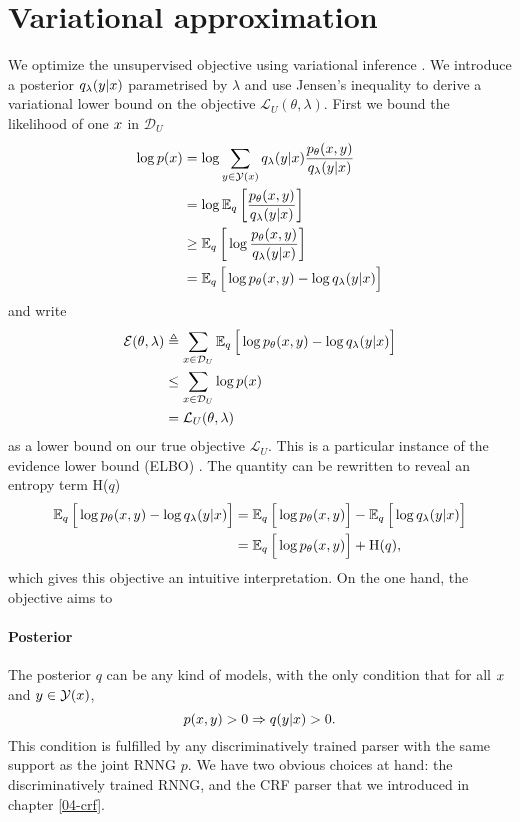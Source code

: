 \section{Variational approximation} We optimize the unsupervised objective using variational inference \citep{blei2016vi}. We introduce a posterior $q_{\lambda}(y | x)$ parametrised by $\lambda$ and use Jensen's inequality to derive a variational lower bound on the objective $\mathcal{L}_U(\theta, \lambda)$. First we bound the likelihood of one $x$ in $\mathcal{D}_U$
\begin{align*}
  \log p (x)
    &= \log \sum_{y  \in \mathcal{Y}(x)} q_{\lambda}(y |x) \frac{p_{\theta}(x,y )}{q_{\lambda}(y | x)} \\
    &= \log \operatorname{\mathbb{E}}_{q} \bigg[\frac{p_{\theta}(x,y )}{ q_{\lambda}(y | x)} \bigg] \\
    &\geq \operatorname{\mathbb{E}}_{q} \bigg[\log \frac{p_{\theta}(x,y )}{q_{\lambda}(y | x)} \bigg] \\
    &= \operatorname{\mathbb{E}}_{q} \Big[\log p_{\theta}(x,y )  - \log q_{\lambda}(y | x) \Big]
  \label{eq:lowerbound}
\end{align*}
and write
\begin{align}
  \operatorname{\mathcal{E}}(\theta, \lambda)
   &\triangleq \sum_{x \in \mathcal{D}_U} \operatorname{\mathbb{E}}_{q} \Big[\log p_{\theta}(x,y )  - \log q_{\lambda}(y | x) \Big] \nonumber \\
   &\leq \sum_{x \in \mathcal{D}_U} \log p (x) \nonumber \\
   &= \mathcal{L}_{U}(\theta, \lambda)
\end{align}
as a lower bound on our true objective $\mathcal{L}_{U}$. This is a particular instance of the evidence lower bound (ELBO) \citep{blei2016vi}. The quantity can be rewritten to reveal an entropy term H($q$)
\begin{align*}
  \operatorname{\mathbb{E}}_{q} \Big[\log p_{\theta}(x,y )  - \log  q_{\lambda}(y | x) \Big]
    &=\operatorname{\mathbb{E}}_{q} \Big[\log p_{\theta}(x,y ) \Big]  - \operatorname{\mathbb{E}}_{q} \Big[\log q_{\lambda}(y | x) \Big] \\
    &= \operatorname{\mathbb{E}}_{q} \Big[\log p_{\theta}(x,y ) \Big]  + \text{H}(q),
  \label{eq:expectation}
\end{align*}
which gives this objective an intuitive interpretation. On the one hand, the objective aims to

\paragraph{Posterior}
The posterior $q$ can be any kind of models, with the only condition that for all $ x $ and $ y \in \mathcal{Y}(x)$,
\begin{equation*}
  p(x, y) > 0 \Rightarrow q( y| x ) > 0.
\end{equation*}
This condition is fulfilled by any discriminatively trained parser with the same support as the joint RNNG $p$. We have two obvious choices at hand: the discriminatively trained RNNG, and the CRF parser that we introduced in chapter \ref{04-crf}.

